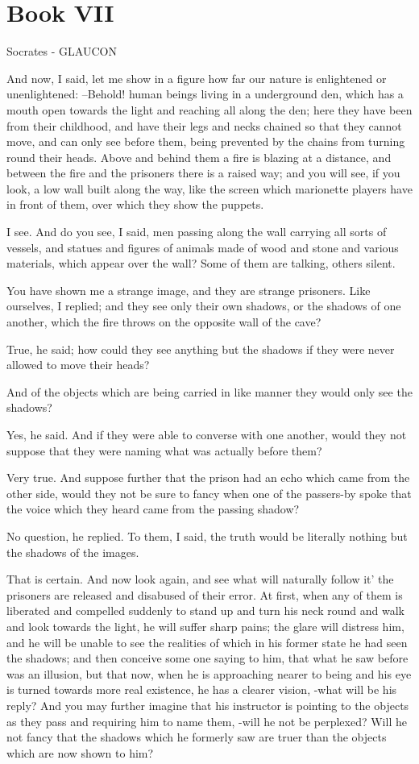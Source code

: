 \chapter{Book VII}

Socrates - GLAUCON

And now, I said, let me show in a figure how far our nature is enlightened or unenlightened: --Behold! human beings living in a underground den, which has a mouth open towards the light and reaching all along the den; here they have been from their childhood, and have their legs and necks chained so that they cannot move, and can only see before them, being prevented by the chains from turning round their heads. Above and behind them a fire is blazing at a distance, and between the fire and the prisoners there is a raised way; and you will see, if you look, a low wall built along the way, like the screen which marionette players have in front of them, over which they show the puppets.

I see.
And do you see, I said, men passing along the wall carrying all sorts of vessels, and statues and figures of animals made of wood and stone and various materials, which appear over the wall? Some of them are talking, others silent.

You have shown me a strange image, and they are strange prisoners.
Like ourselves, I replied; and they see only their own shadows, or the shadows of one another, which the fire throws on the opposite wall of the cave?

True, he said; how could they see anything but the shadows if they were never allowed to move their heads?

And of the objects which are being carried in like manner they would only see the shadows?

Yes, he said.
And if they were able to converse with one another, would they not suppose that they were naming what was actually before them?

Very true.
And suppose further that the prison had an echo which came from the other side, would they not be sure to fancy when one of the passers-by spoke that the voice which they heard came from the passing shadow?

No question, he replied.
To them, I said, the truth would be literally nothing but the shadows of the images.

That is certain.
And now look again, and see what will naturally follow it' the prisoners are released and disabused of their error. At first, when any of them is liberated and compelled suddenly to stand up and turn his neck round and walk and look towards the light, he will suffer sharp pains; the glare will distress him, and he will be unable to see the realities of which in his former state he had seen the shadows; and then conceive some one saying to him, that what he saw before was an illusion, but that now, when he is approaching nearer to being and his eye is turned towards more real existence, he has a clearer vision, -what will be his reply? And you may further imagine that his instructor is pointing to the objects as they pass and requiring him to name them, -will he not be perplexed? Will he not fancy that the shadows which he formerly saw are truer than the objects which are now shown to him?

